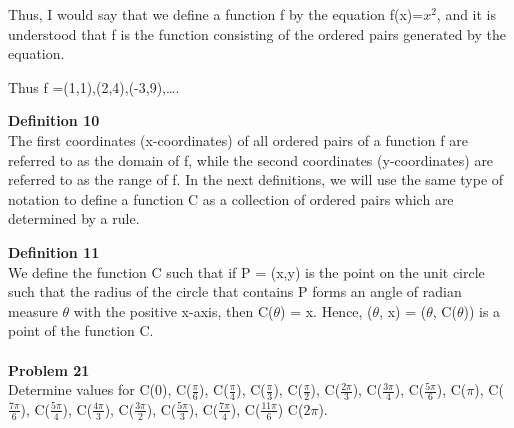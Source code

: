 \documentclass[11pt]{article} %
\newcommand\tab[1][1cm]{\hspace*{#1}}
\begin{document}
Thus, I would say that we define a function f by the equation f(x)=$x^2$, and it is understood that f is the function consisting of the ordered pairs generated by the equation. 

Thus f ={(1,1),(2,4),(-3,9),\dots}. 

\textbf{Definition 10}
\\ \tab The first coordinates (x-coordinates) of all ordered pairs of a function f are referred to as the domain of f, while the second coordinates (y-coordinates) are referred to as the range of f.
In the next definitions, we will use the same type of notation to define a function C as a collection of ordered pairs which are determined by a rule.

\textbf{Definition 11} \\
\tab We define the function C such that if P = (x,y) is the point on the unit circle such that the radius of the circle that contains P forms an angle of radian measure $\theta$ with the positive x-axis, then C($\theta$) = x. Hence, ($\theta$, x) = ($\theta$, C($\theta$)) is a point of the function C. 
\\
\\
\textbf{Problem 21}
\\ \tab Determine values for C(0), C($\frac{\pi}{6}$), C($\frac{\pi}{4}$), C($\frac{\pi}{3}$), C($\frac{\pi}{2}$),
C($\frac{2\pi}{3}$), C($\frac{3\pi}{4}$), C($\frac{5\pi}{6}$), C($\pi$), C($\frac{7\pi}{6}$), C($\frac{5\pi}{4}$),
C($\frac{4\pi}{3}$), C($\frac{3\pi}{2}$), C($\frac{5\pi}{3}$), C($\frac{7\pi}{4}$), C($\frac{11\pi}{6}$) C($2\pi$).

\newpage
\end{document}
